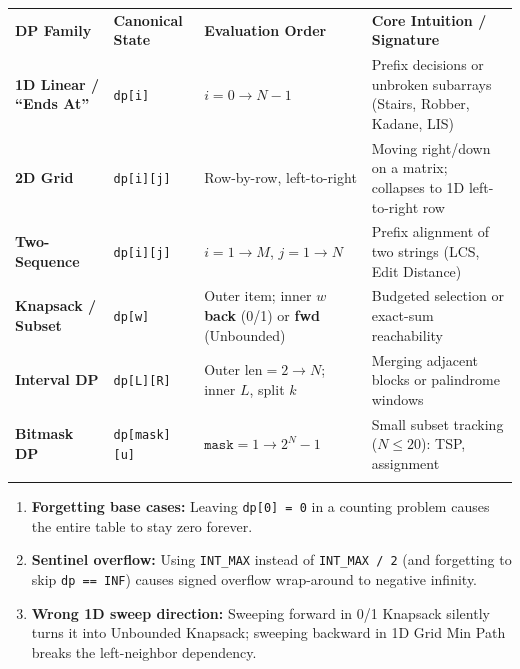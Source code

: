 \documentclass[11pt,a4paper]{article}
\theoremstyle{definition}
\begin{document}
\begingroup\small{}
\begin{tabularx}{\textwidth}{>{\raggedright\arraybackslash\bfseries}p{3.3cm} >{\raggedright\arraybackslash}p{3.0cm} >{\raggedright\arraybackslash}p{3.3cm} >{\raggedright\arraybackslash}X}
\arrayrulecolor{primaryblue}\toprule[1.2pt]
\rowcolor{primaryblue!10}
\textcolor{primaryblue}{\textbf{DP Family}} & \textcolor{primaryblue}{\textbf{Canonical State}} & \textcolor{primaryblue}{\textbf{Evaluation Order}} & \textcolor{primaryblue}{\textbf{Core Intuition / Signature}} \\
\arrayrulecolor{codeframe}\midrule[0.6pt]
1D Linear / ``Ends At'' & \texttt{dp[i]} & $i = 0 \to N-1$ & Prefix decisions or unbroken subarrays (Stairs, Robber, Kadane, LIS) \\
2D Grid & \texttt{dp[i][j]} & Row-by-row, left-to-right & Moving right/down on a matrix; collapses to 1D left-to-right row \\
Two-Sequence & \texttt{dp[i][j]} & $i = 1 \to M$, $j = 1 \to N$ & Prefix alignment of two strings (LCS, Edit Distance) \\
Knapsack / Subset & \texttt{dp[w]} & Outer item; inner $w$ \textbf{back} (0/1) or \textbf{fwd} (Unbounded) & Budgeted selection or exact-sum reachability \\
Interval DP & \texttt{dp[L][R]} & Outer $\text{len} = 2 \to N$; inner $L$, split $k$ & Merging adjacent blocks or palindrome windows \\
Bitmask DP & \texttt{dp[mask][u]} & $\texttt{mask} = 1 \to 2^N - 1$ & Small subset tracking ($N \le 20$): TSP, assignment \\
\arrayrulecolor{primaryblue}\bottomrule[1.2pt]
\end{tabularx}\endgroup

\begin{watchoutbox}
\begin{enumerate}
    \item \textbf{Forgetting base cases:} Leaving \texttt{dp[0] = 0} in a counting problem causes the entire table to stay zero forever.
    \item \textbf{Sentinel overflow:} Using \texttt{INT\_MAX} instead of \texttt{INT\_MAX / 2} (and forgetting to skip \texttt{dp == INF}) causes signed overflow wrap-around to negative infinity.
    \item \textbf{Wrong 1D sweep direction:} Sweeping forward in 0/1 Knapsack silently turns it into Unbounded Knapsack; sweeping backward in 1D Grid Min Path breaks the left-neighbor dependency.
\end{enumerate}
\end{watchoutbox}
\end{document}
